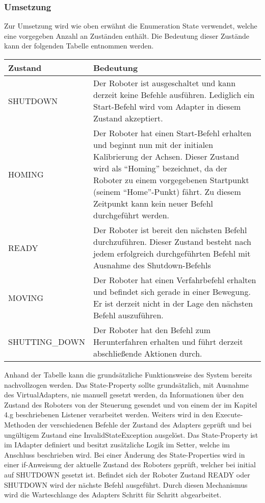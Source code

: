 \subsubsection{Umsetzung}
Zur Umsetzung wird wie oben erwähnt die Enumeration State verwendet, welche eine vorgegeben Anzahl an Zuständen enthält. Die Bedeutung dieser Zustände kann der folgenden Tabelle entnommen werden.
\newline
\begin{tabular}{|p{4cm}|p{10cm}|}
\hline \rowcolor{lightgray}
\textbf{Zustand} & \textbf{Bedeutung}\\
\hline
SHUTDOWN & Der Roboter ist ausgeschaltet und kann derzeit keine Befehle ausführen. Lediglich ein Start-Befehl wird vom Adapter in diesem Zustand akzeptiert.\\
\hline
HOMING & Der Roboter hat einen Start-Befehl erhalten und beginnt nun mit der initialen Kalibrierung der Achsen. Dieser Zustand wird als “Homing” bezeichnet, da der Roboter zu einem vorgegebenen Startpunkt (seinem “Home”-Punkt) fährt. Zu diesem Zeitpunkt kann kein neuer Befehl durchgeführt werden.\\
\hline
READY & Der Roboter ist bereit den nächsten Befehl durchzuführen. Dieser Zustand besteht nach jedem erfolgreich durchgeführten Befehl mit Ausnahme des Shutdown-Befehls \\
\hline
MOVING & Der Roboter hat einen Verfahrbefehl erhalten und befindet sich gerade in einer Bewegung. Er ist derzeit nicht in der Lage den nächsten Befehl auszuführen.\\
\hline
SHUTTING\_DOWN & Der Roboter hat den Befehl zum Herunterfahren erhalten und führt derzeit abschließende Aktionen durch.\\ 
\hline
\end{tabular}
\newline
\newline
Anhand der Tabelle kann die grundsätzliche Funktionsweise des System bereits nachvollzogen werden. Das State-Property sollte grundsätzlich, mit Ausnahme des VirtualAdapters, nie manuell gesetzt werden, da Informationen über den Zustand des Roboters von der Steuerung gesendet und von einem der im Kapitel 4.g beschriebenen Listener verarbeitet werden. Weiters wird in den Execute-Methoden der verschiedenen Befehle der Zustand des Adapters geprüft und bei ungültigem Zustand eine InvalidStateException ausgelöst.
\newline
\newline
Das State-Property ist im IAdapter definiert und besitzt zusätzliche Logik im Setter, welche im Anschluss beschrieben wird. Bei einer Änderung des State-Properties wird in einer if-Anweisung der aktuelle Zustand des Roboters geprüft, welcher bei initial auf SHUTDOWN gesetzt ist. Befindet sich der Roboter Zustand READY oder SHUTDOWN wird der nächste Befehl ausgeführt. Durch diesen Mechanismus wird die Warteschlange des Adapters Schritt für Schritt abgearbeitet.

